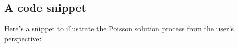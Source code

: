 

\newpage
\subsection{A code snippet}

Here's a snippet to illustrate the Poisson solution process from the user's perspective:

